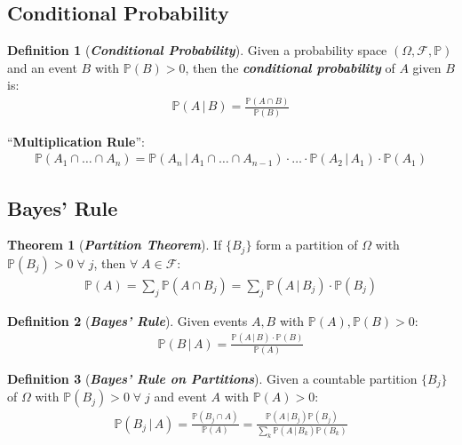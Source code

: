 \documentclass[12pt]{extarticle}
\newcommand{\pstart}[0]{\noindent}
\newcommand{\term}[1]{\textbf{\textit{#1}}}
\theoremstyle{definition}
\newtheorem*{definition}{Definition}
\newtheorem*{theorem}{Theorem}
\theoremstyle{remark}
\newcommand{\prob}[1]{\mathbb{P}\left(#1\right)}
\newcommand{\cond}[2]{#1\,\vert\,#2}
\begin{document}
\subsection{Conditional Probability}
\begin{tcolorbox}[colback=blue!20!white]
    \begin{definition}[\term{Conditional Probability}]
        Given a probability space $(\Omega,\mathcal{F},\mathbb{P})$ and an 
event $B$ with $\mathbb{P}(B)>0$, then the \term{conditional probability} 
of $A$ given $B$ is: 
        \begin{gather*}
            \prob{\cond{A}{B}}=\frac{\prob{A\cap B}}{\prob{B}}
        \end{gather*} 
    \end{definition}    
\end{tcolorbox}

\pstart
``\textbf{Multiplication Rule}'': \begin{gather*}
    \prob{A_1\cap\hdots\cap A_n}=\prob{\cond{A_n}{A_1\cap\hdots\cap 
A_{n-1}}}\cdot\hdots\cdot\prob{\cond{A_2}{A_1}}\cdot\prob{A_1}
\end{gather*}

\subsection{Bayes' Rule}
\begin{theorem}[\term{Partition Theorem}]
    If $\{B_j\}$ form a partition of $\Omega$ with 
$\prob{B_j}>0\;\forall\;j$, then $\forall\;A\in\mathcal{F}$: 
\begin{align*}
        \prob{A}=\sum_j\prob{A\cap 
B_j}=\sum_j\prob{\cond{A}{B_j}}\cdot\prob{B_j}
    \end{align*}
\end{theorem}

\begin{tcolorbox}[colback=blue!50!red!15!white]
    \begin{definition}[\term{Bayes' Rule}]
        Given events $A,B$ with $\prob{A},\prob{B}>0$: \begin{align*}            
\prob{\cond{B}{A}}=\frac{\prob{\cond{A}{B}}\cdot\prob{B}}{\prob{A}}
        \end{align*}
    \end{definition}
\end{tcolorbox}

\begin{definition}[\term{Bayes' Rule on Partitions}]
    Given a countable partition $\{B_j\}$ of $\Omega$ with 
$\prob{B_j}>0\;\forall\;j$ and event $A$ with $\prob{A}>0$: \begin{align*}
        \prob{\cond{B_j}{A}}=\frac{\prob{B_j\cap 
A}}{\prob{A}}=\frac{\prob{\cond{A}{B_j}}\prob{B_j}}{\sum_k\prob{\cond{A}{B_k}}\prob{B_k}}
    \end{align*}
\end{definition}
\end{document}
